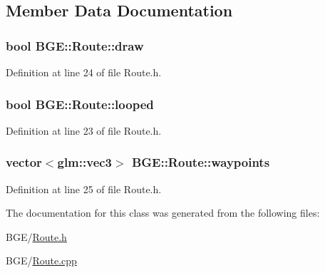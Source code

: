 \subsection{Member Data Documentation}
\hypertarget{class_b_g_e_1_1_route_a503ab27496b899c91058fbe3818ef39b}{
\subsubsection[{draw}]{\setlength{\rightskip}{0pt plus 5cm}bool B\-G\-E\-::\-Route\-::draw}}\label{class_b_g_e_1_1_route_a503ab27496b899c91058fbe3818ef39b}


Definition at line 24 of file Route.\-h.

\hypertarget{class_b_g_e_1_1_route_aceee6cb3e091c85142ebd416205d2dd5}{
\subsubsection[{looped}]{\setlength{\rightskip}{0pt plus 5cm}bool B\-G\-E\-::\-Route\-::looped}}\label{class_b_g_e_1_1_route_aceee6cb3e091c85142ebd416205d2dd5}


Definition at line 23 of file Route.\-h.

\hypertarget{class_b_g_e_1_1_route_a9d00bdb0705bf635b78774a84a9fc791}{
\subsubsection[{waypoints}]{\setlength{\rightskip}{0pt plus 5cm}vector$<$glm\-::vec3$>$ B\-G\-E\-::\-Route\-::waypoints}}\label{class_b_g_e_1_1_route_a9d00bdb0705bf635b78774a84a9fc791}


Definition at line 25 of file Route.\-h.



The documentation for this class was generated from the following files\-:\begin{DoxyCompactItemize}
\item 
B\-G\-E/\hyperlink{_route_8h}{Route.\-h}\item 
B\-G\-E/\hyperlink{_route_8cpp}{Route.\-cpp}\end{DoxyCompactItemize}
